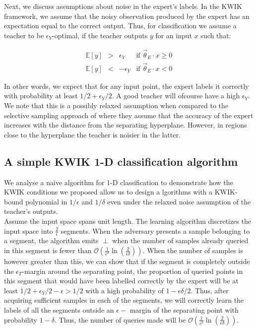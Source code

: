 Next, we discuss assumptions about noise in the expert's labels. 
In the KWIK framework, we assume that the noisy observation produced by the expert has an expectation equal to the correct output. Thus, for classification we assume a teacher to be $\epsilon_Y$-optimal, if the teacher outputs  $y$ for an input $x$ such that:

\[
\begin{array}{rccl}
 \mathbb{E}[y] & > &\epsilon_Y & \text{if } \vec{\theta}_E \cdot x \geq 0 \\
 \mathbb{E}[y] &< &-\epsilon_Y & \text{if } \vec{\theta}_E \cdot x < 0
\end{array}
\]

In other words, we expect that for any input point, the expert labels it correctly with probability at least $1/2 + \epsilon_Y/2$.  A good teacher will ofcourse have a high $\epsilon_Y$. We note that this is a possibly relaxed assumption when compared to the selective sampling approach of \citet{Cesa-Bianchi:2009:RBC:1553374.1553390} where they assume that the accuracy of the expert increases with the distance from the separating hyperplane. However, in regions close to the hyperplane the teacher is noisier in the latter. 

\subsection{A simple KWIK 1-D classification algorithm}
We analyse a naive algorithm for 1-D classification to demonstrate how the KWIK conditions we proposed  allow us to design a	lgorithms with a KWIK-bound polynomial in $1/\epsilon$ and $1/\delta$ even under the relaxed noise assumption of the teacher's outputs.\\

 Assume the input space spans unit length. The learning algorithm discretizes the input space into $\frac{2}{\epsilon}$  segments. When the adversary presents a sample belonging to a segment, the algorithm emits $\perp$ when the number of samples already queried in this segment is fewer than $\mathcal{O}(\frac{1}{\epsilon^2} \ln(\frac{2}{\epsilon\delta}))$. When the number of samples is however greater than this, we can show that if the segment is completely outside the $\epsilon_T$-margin around the separating point, the proportion of queried points in this segment that would have been labelled correctly by the expert will be at least $1/2 + \epsilon_Y/2 - \epsilon > 1/2$ with a high probability  of $1-\epsilon\delta/2$. Thus, after acquiring sufficient samples in each of the segments, we will correctly learn the labels of all the segments outside an $\epsilon-$ margin of the separating point with probability $1-\delta$. Thus, the number of queries made will be $\mathcal{O}(\frac{1}{\epsilon^3} \ln(\frac{2}{\epsilon\delta}))$.







